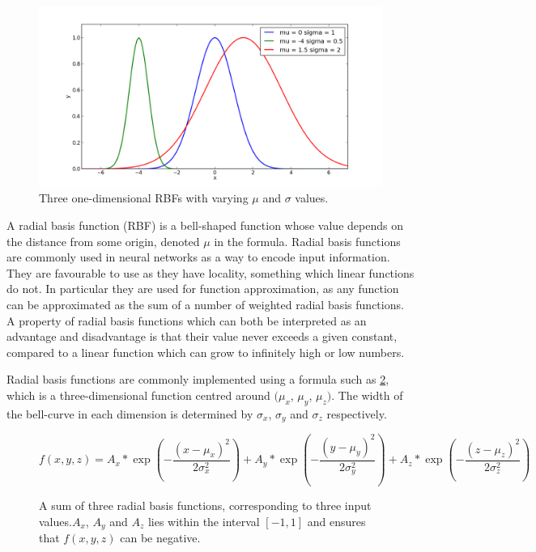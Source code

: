 \documentclass[a4paper,11pt]{kth-mag}
\begin{document}
\begin{figure}
\centering\includegraphics[scale=0.5]{rbf_1d.png}
\caption{Three one-dimensional RBFs with varying $\mu$ and $\sigma$ values.}
\label{3-RBF-functions}
\end{figure}

A radial basis function (RBF) is a bell-shaped function whose value depends on the distance from some origin, denoted $\mu$ in the formula.  Radial basis functions are commonly used in neural networks as a way to encode input information. They are favourable to use as they have locality, something which linear functions do not. In particular they are used for function approximation, as any function can be approximated as the sum of a number of weighted radial basis functions. A property of radial basis functions which can both be interpreted as an advantage and disadvantage is that their value never exceeds a given constant, compared to a linear function which can grow to infinitely high or low numbers.

Radial basis functions are commonly implemented using a formula such as \ref{RBF-1}, which is a three-dimensional function centred around $(\mu _{x}$, $\mu _{y}$, $\mu _{z})$. The width of the bell-curve in each dimension is determined by $\sigma _{x}$, $\sigma _{y}$ and $\sigma _{z}$ respectively.

\begin{figure}
\begin{equation}
f(x,y,z) = A_x*\exp(-\frac{(x-\mu_{x})^{2}}{2 \sigma _{x}^{2}}) + A_y*\exp(-\frac{(y-\mu_{y})^{2}}{2 \sigma _{y}^{2}}) + A_z*\exp(-\frac{(z-\mu_{z})^{2}}{2 \sigma _{z}^{2}})
\end{equation}
\caption{A sum of three radial basis functions, corresponding to three input values.$A_x$, $A_y$ and $A_z$ lies within the interval $[-1,1]$ and ensures that $f(x,y,z)$ can be negative.}
\label{RBF-1}
\end{figure}
\end{document}
